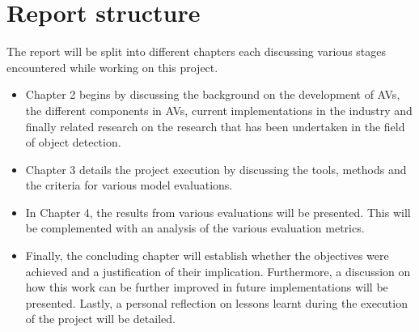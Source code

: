 \section{Report structure}
The report will be split into different chapters each discussing various stages encountered while working on this project. 
\begin{itemize}

	\item Chapter 2 begins by discussing the background on the development of AVs, the different components in AVs, current implementations in the industry and finally related research on the research that has been undertaken in the field of object detection.
	
	\item Chapter 3 details the project execution by discussing the tools, methods and the criteria for various model evaluations.
	
	\item In Chapter 4, the results from various evaluations will be presented. This will be complemented with an analysis of the various evaluation metrics. 
	
	\item Finally, the concluding chapter will establish whether the objectives were achieved and a justification of their implication. Furthermore, a discussion on how this work can be further improved in future implementations will be presented. Lastly, a personal reflection on lessons learnt during the execution of the project will be detailed. 
\end{itemize}


